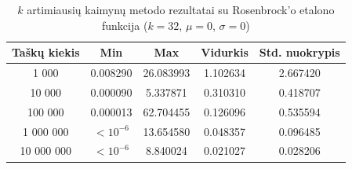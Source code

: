 \begin{table}[H]
    \centering
    \begin{tabular}{|c|c|c|c|c|}
        \hline
        \textbf{Taškų kiekis} & \textbf{Min} & \textbf{Max} & \textbf{Vidurkis} & \textbf{Std. nuokrypis} \\ \hline
        1 000        & 0.008290 & 26.083993 & 1.102634 & 2.667420 \\ \hline
        10 000       & 0.000090 & 5.337871 & 0.310310 & 0.418707 \\ \hline
        100 000      & 0.000013 & 62.704455 & 0.126096 & 0.535594 \\ \hline
        1 000 000    & $<10^{-6}$ & 13.654580 & 0.048357 & 0.096485 \\ \hline
        10 000 000   & $<10^{-6}$ & 8.840024 & 0.021027 & 0.028206 \\ \hline
    \end{tabular}
    \caption{$k$ artimiausių kaimynų metodo rezultatai su Rosenbrock'o etalono funkcija ($k = 32$, $\mu = 0$, $\sigma = 0$)}
\end{table}